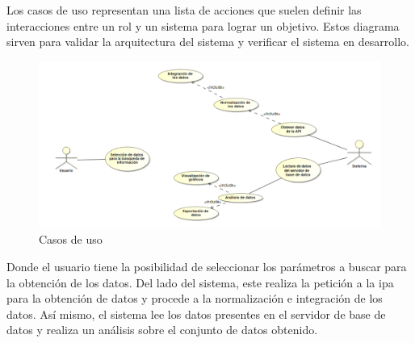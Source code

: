 \documentclass[../../main.tex]{subfiles}
\begin{document}
Los casos de uso representan una lista de acciones que suelen definir las interacciones entre un rol y un sistema para lograr un objetivo. Estos diagrama sirven para validar la arquitectura del sistema y verificar el sistema en desarrollo. 

\begin{figure}[H]
\centering
\includegraphics[width=470pt]{images/requisitos/use-case-1.png}
\caption{Casos de uso}
\end{figure}

Donde el usuario tiene la posibilidad de seleccionar los parámetros a buscar para la obtención de los datos. Del lado del sistema, este realiza la petición a la \gls{ipa} para la obtención de datos y procede a la normalización e integración de los datos. Así mismo, el sistema lee los datos presentes en el servidor de base de datos y realiza un análisis sobre el conjunto de datos obtenido.
\end{document}

